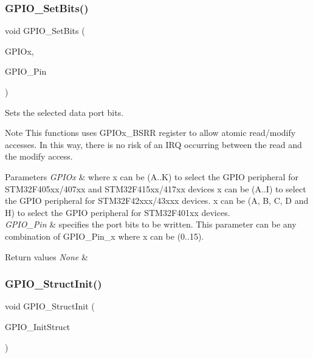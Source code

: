 \subsubsection{\texorpdfstring{G\+P\+I\+O\+\_\+\+Set\+Bits()}{GPIO\_SetBits()}}
{\footnotesize\ttfamily void G\+P\+I\+O\+\_\+\+Set\+Bits (\begin{DoxyParamCaption}\item[{G\+P\+I\+O\+\_\+\+Type\+Def $\ast$}]{G\+P\+I\+Ox,  }\item[{uint16\+\_\+t}]{G\+P\+I\+O\+\_\+\+Pin }\end{DoxyParamCaption})}



Sets the selected data port bits. 

\begin{DoxyNote}{Note}
This functions uses G\+P\+I\+Ox\+\_\+\+B\+S\+RR register to allow atomic read/modify accesses. In this way, there is no risk of an I\+RQ occurring between the read and the modify access. 
\end{DoxyNote}

\begin{DoxyParams}{Parameters}
{\em G\+P\+I\+Ox} & where x can be (A..K) to select the G\+P\+IO peripheral for S\+T\+M32\+F405xx/407xx and S\+T\+M32\+F415xx/417xx devices x can be (A..I) to select the G\+P\+IO peripheral for S\+T\+M32\+F42xxx/43xxx devices. x can be (A, B, C, D and H) to select the G\+P\+IO peripheral for S\+T\+M32\+F401xx devices. \\
\hline
{\em G\+P\+I\+O\+\_\+\+Pin} & specifies the port bits to be written. This parameter can be any combination of G\+P\+I\+O\+\_\+\+Pin\+\_\+x where x can be (0..15). \\
\hline
\end{DoxyParams}

\begin{DoxyRetVals}{Return values}
{\em None} & \\
\hline
\end{DoxyRetVals}
\mbox{\label{group___g_p_i_o_gab28de41278e7f8c63d0851e2733b10df}} 
\subsubsection{\texorpdfstring{G\+P\+I\+O\+\_\+\+Struct\+Init()}{GPIO\_StructInit()}}
{\footnotesize\ttfamily void G\+P\+I\+O\+\_\+\+Struct\+Init (\begin{DoxyParamCaption}\item[{\mbox{\hyperlink{struct_g_p_i_o___init_type_def}{G\+P\+I\+O\+\_\+\+Init\+Type\+Def}} $\ast$}]{G\+P\+I\+O\+\_\+\+Init\+Struct }\end{DoxyParamCaption})}



